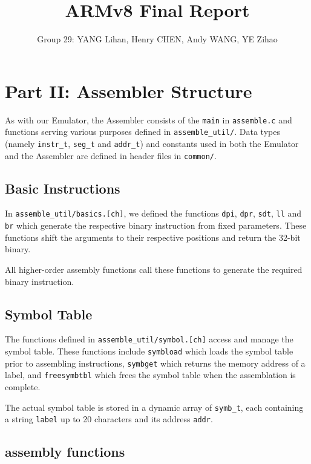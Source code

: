 \documentclass[11pt]{article}
\begin{document}
\title{ARMv8 Final Report}
\author{Group 29: YANG Lihan, Henry CHEN, Andy WANG, YE Zihao}

\maketitle

\section{Part II: Assembler Structure}

As with our Emulator, the Assembler consists of the \texttt{main} in \texttt{assemble.c} and functions serving various purposes defined in \texttt{assemble\_util/}. Data types (namely \texttt{instr\_t}, \texttt{seg\_t} and \texttt{addr\_t}) and constants used in both the Emulator and the Assembler are defined in header files in \texttt{common/}.

\subsection{Basic Instructions}

In \texttt{assemble\_util/basics.[ch]}, we defined the functions \texttt{dpi}, \texttt{dpr}, \texttt{sdt}, \texttt{ll} and \texttt{br} which generate the respective binary instruction from fixed parameters. These functions shift the arguments to their respective positions and return the 32-bit binary.

All higher-order assembly functions call these functions to generate the required binary instruction.

\subsection{Symbol Table}

The functions defined in \texttt{assemble\_util/symbol.[ch]} access and manage the symbol table. These functions include \texttt{symbload} which loads the symbol table prior to assembling instructions, \texttt{symbget} which returns the memory address of a label, and \texttt{freesymbtbl} which frees the symbol table when the assemblation is complete.

The actual symbol table is stored in a dynamic array of \texttt{symb\_t}, each containing a string \texttt{label} up to 20 characters and its address \texttt{addr}.

\subsection{assembly functions}
\end{document}
